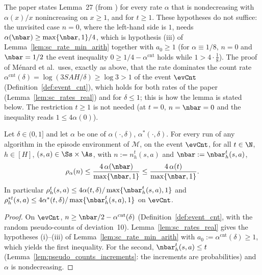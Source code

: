 \begin{remark}\label{rem:sc_lemma27}
The paper states Lemma~27 (from \cite[Lemma~7]{menard2021fast}) for every rate $\alpha$ that is
nondecreasing with $\alpha(x)/x$ nonincreasing on $x \ge 1$, and for $t \ge 1$. These hypotheses
do not suffice: the unvisited case $n = 0$, where the left-hand side is $1$, needs
$\alpha(\nbar) \ge \max\{\nbar,1\}/4$, which is hypothesis (iii) of
Lemma~\ref{lem:sc_rate_min_arith} together with $a_0 \ge 1$ (for $\alpha \equiv 1/8$, $n = 0$ and
$\nbar = 1/2$ the event inequality $0 \ge 1/4 - \alpha^{\mathrm{cnt}}$ holds while $1 > 4\cdot\frac18$).
The proof of M\'enard et al.\ uses, exactly as above, that the rate dominates the count rate
$\alpha^{\mathrm{cnt}}(\delta) = \log(3SAH/\delta) \ge \log 3 > 1$ of the event
$\evCnt$ (Definition~\ref{def:event_cnt}), which holds for both rates of the paper
(Lemma~\ref{lem:sc_rates_real}) and for $\delta \le 1$; this is how the lemma is stated below.
The restriction $t \ge 1$ is not needed (at $t = 0$, $n = \nbar = 0$ and the inequality reads
$1 \le 4\alpha(0)$).
\end{remark}

\begin{lemma}\label{lem:pseudo_counts_bound}
\leanok
Let $\delta \in (0, 1]$ and let $\alpha$ be one of $\alpha(\cdot,\delta)$, $\alpha^*(\cdot,\delta)$.
For every run of any algorithm in the episode environment of $\mathcal M$, on the event
$\evCnt$, for all $t \in \N$, $h \in [H]$, $(s,a) \in \Ss\times\As$, with
$n := n_h^t(s,a)$ and $\nbar := \nbar_h^t(s,a)$,
\[
  \rho_\alpha(n) \le \frac{4\,\alpha(\nbar)}{\max\{\nbar, 1\}} \le \frac{4\,\alpha(t)}{\max\{\nbar,1\}} .
\]
In particular $\rho^t_h(s,a) \le 4\alpha(t,\delta)/\max\{\nbar_h^t(s,a),1\}$ and
$\rho^{*t}_h(s,a) \le 4\alpha^*(t,\delta)/\max\{\nbar_h^t(s,a),1\}$ on $\evCnt$.
\end{lemma}

\begin{proof}
\leanok
{}
On $\evCnt$, $n \ge \nbar/2 - \alpha^{\mathrm{cnt}}(\delta)$ (Definition~\ref{def:event_cnt}, with the
random pseudo-counts of deviation~10). Lemma~\ref{lem:sc_rates_real} gives the hypotheses
(i)--(iii) of Lemma~\ref{lem:sc_rate_min_arith} with $a_0 := \alpha^{\mathrm{cnt}}(\delta) \ge 1$,
which yields the first inequality. For the second, $\nbar_h^t(s,a) \le t$
(Lemma~\ref{lem:pseudo_counts_increments}: the increments are probabilities) and $\alpha$ is
nondecreasing.
\end{proof}

